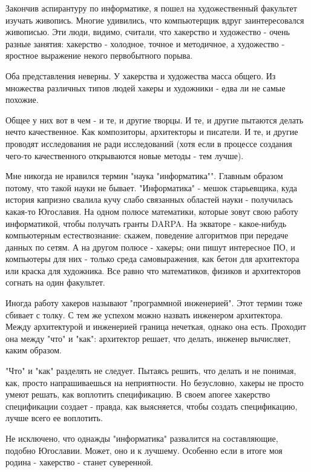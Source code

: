 \documentclass[ebook,12pt,oneside,openany]{memoir}
\begin{document}
\maketitle

Закончив аспирантуру по информатике, я пошел на художественный
факультет изучать живопись. Многие удивились, что компьютерщик вдруг
заинтересовался живописью. Эти люди, видимо, считали, что хакерство и
художество - очень разные занятия: хакерство - холодное, точное и
методичное, а художество - яростное выражение некого первобытного
порыва.

Оба представления неверны. У хакерства и художества масса общего. Из
множества различных типов людей хакеры и художники - едва ли не самые
похожие.

Общее у них вот в чем - и те, и другие творцы. И те, и другие пытаются
делать нечто качественное. Как композиторы, архитекторы и писатели. И
те, и другие проводят исследования не ради исследований (хотя если в
процессе создания чего-то качественного открываются новые методы - тем
лучше).

Мне никогда не нравился термин "наука "информатика"". Главным образом
потому, что такой науки не бывает. "Информатика" - мешок старьевщика,
куда история капризно свалила кучу слабо связанных областей науки -
получилась какая-то Югославия. На одном полюсе математики, которые
зовут свою работу информатикой, чтобы получать гранты DARPA. На
экваторе - какое-нибудь компьютерным естествознание: скажем, поведение
алгоритмов при передаче данных по сетям. А на другом полюсе - хакеры;
они пишут интересное ПО, и компьютеры для них - только среда
самовыражения, как бетон для архитектора или краска для художника. Все
равно что математиков, физиков и архитекторов согнать на один
факультет.

Иногда работу хакеров называют "программной инженерией". Этот термин
тоже сбивает с толку. С тем же успехом можно назвать инженером
архитектора. Между архитектурой и инженерией граница нечеткая, однако
она есть. Проходит она между "что" и "как": архитектор решает, что
делать, инженер вычисляет, каким образом.

"Что" и "как" разделять не следует. Пытаясь решить, что делать и не
понимая, как, просто напрашиваешься на неприятности. Но безусловно,
хакеры не просто умеют решать, как воплотить спецификацию. В своем
апогее хакерство спецификации создает - правда, как выясняется, чтобы
создать спецификацию, лучше всего ее воплотить.

Не исключено, что однажды "информатика" развалится на составляющие,
подобно Югославии. Может, оно и к лучшему. Особенно если в итоге моя
родина - хакерство - станет суверенной.
\end{document}
